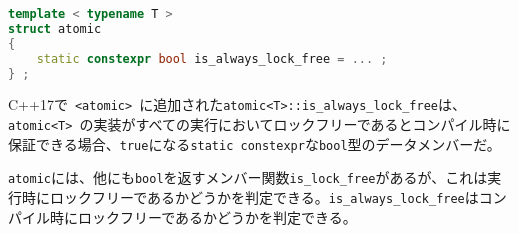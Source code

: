 %

\bgroup
\begin{lstlisting}[language=C++]
template < typename T >
struct atomic
{
    static constexpr bool is_always_lock_free = ... ;
} ;
\end{lstlisting}
\egroup

C++17で~\lstinline!<atomic>!~に追加された\lstinline!atomic<T>::is_always_lock_free!は、\lstinline!atomic<T>!~の実装がすべての実行においてロックフリーであるとコンパイル時に保証できる場合、\lstinline!true!になる\lstinline!static constexpr!な\lstinline!bool!型のデータメンバーだ。

\lstinline!atomic!には、他にも\lstinline!bool!を返すメンバー関数\lstinline!is_lock_free!があるが、これは実行時にロックフリーであるかどうかを判定できる。\lstinline!is_always_lock_free!はコンパイル時にロックフリーであるかどうかを判定できる。
